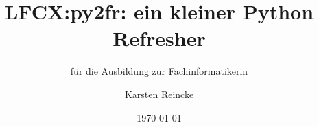 \documentclass[]{beamer}
\title{LFCX:py2fr: ein kleiner Python Refresher}
\subtitle{für die Ausbildung zur Fachinformatikerin}
\institute[GS-LDK]{Gewerbliche Schulen Dillenburg}
\author{Karsten Reincke}
\date{\today}
\def\cfgGl{../../../cfg.gl/}
\begin{document}

\begin{frame}
  \titlepage

  
\end{frame}






\logo{}
\newpage



%
\end{document}
